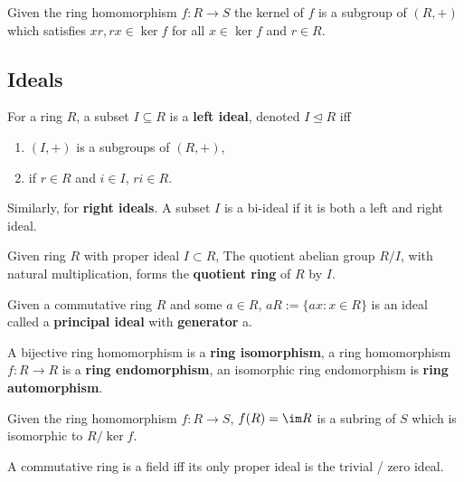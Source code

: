 \documentclass[../Year2.tex]{subfiles}
\begin{document}
\begin{lemma}
    Given the ring homomorphism $f:R\rightarrow S$ the kernel of $f$ is a subgroup of $(R,+)$ which satisfies $xr,rx\in\ker f$ for all $x\in \ker f$ and $r\in R$.
\end{lemma}

\subsection{Ideals}

\begin{definition}[Ideal]
    For a ring $R$, a subset $I\subseteq R$ is a \textbf{left ideal}, denoted $I\unlhd R$ iff \begin{enumerate}
        \item $(I,+)$ is a subgroups of $(R,+)$,
        \item if $r\in R$ and $i\in I$, $ri\in R$.
    \end{enumerate} Similarly, for \textbf{right ideals}. A subset $I$ is a bi-ideal if it is both a left and right ideal.
\end{definition}

\begin{definition}
    Given ring $R$ with proper ideal $I\subset R$, The quotient abelian group $R/I$, with natural multiplication, forms the \textbf{quotient ring} of $R$ by $I$.
\end{definition}

\begin{definition}
    Given a commutative ring $R$ and some $a\in R$, $aR:= \{ax:x\in R\}$ is an ideal called a \textbf{principal ideal} with \textbf{generator} a.
\end{definition}

\begin{definition}
    A bijective ring homomorphism is a \textbf{ring isomorphism}, a ring homomorphism $f:R\rightarrow R$ is a \textbf{ring endomorphism}, an isomorphic ring endomorphism is \textbf{ring automorphism}.
\end{definition}

\begin{proposition}
    Given the ring homomorphism $f:R\rightarrow S$, $f(R)=\im R$ is a subring of $S$ which is isomorphic to $R/\ker f$.
\end{proposition}

\begin{proposition}
    A commutative ring is a field iff its only proper ideal is the trivial / zero ideal.
\end{proposition}
\end{document}
